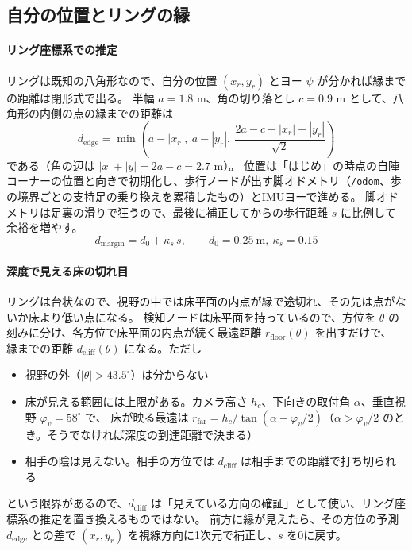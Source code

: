 \documentclass[a4paper,11pt]{ltjsarticle}
\newcommand{\code}[1]{\texttt{#1}}
\begin{document}
\subsection{自分の位置とリングの縁}\label{sec:edge}

\paragraph{リング座標系での推定}
リングは既知の八角形なので、自分の位置 $(x_r,y_r)$ とヨー $\psi$ が分かれば縁までの距離は閉形式で出る。
半幅 $a=1.8$ m、角の切り落とし $c=0.9$ m として、八角形の内側の点の縁までの距離は
\begin{equation}
d_\mathrm{edge}=\min\!\left(a-|x_r|,\ a-|y_r|,\ \frac{2a-c-|x_r|-|y_r|}{\sqrt2}\right)
\label{eq:dedge}
\end{equation}
である（角の辺は $|x|+|y|=2a-c=2.7$ m）。
位置は「はじめ」の時点の自陣コーナーの位置と向きで初期化し、歩行ノードが出す脚オドメトリ（\code{/odom}、歩の境界ごとの支持足の乗り換えを累積したもの）とIMUヨーで進める。
脚オドメトリは足裏の滑りで狂うので、最後に補正してからの歩行距離 $s$ に比例して余裕を増やす。
\begin{equation}
d_\mathrm{margin}=d_0+\kappa_s\,s,\qquad d_0=0.25\ \mathrm{m},\ \kappa_s=0.15
\label{eq:margin}
\end{equation}

\paragraph{深度で見える床の切れ目}
リングは台状なので、視野の中では床平面の内点が縁で途切れ、その先は点がないか床より低い点になる。
検知ノードは床平面を持っているので、方位を $\theta$ の刻みに分け、各方位で床平面の内点が続く最遠距離 $r_\mathrm{floor}(\theta)$ を出すだけで、
縁までの距離 $d_\mathrm{cliff}(\theta)$ になる。ただし
\begin{itemize}
\item 視野の外（$|\theta|>43.5^\circ$）は分からない
\item 床が見える範囲には上限がある。カメラ高さ $h_c$、下向きの取付角 $\alpha$、垂直視野 $\varphi_v=58^\circ$ で、
床が映る最遠は $r_\mathrm{far}=h_c/\tan(\alpha-\varphi_v/2)$（$\alpha>\varphi_v/2$ のとき。そうでなければ深度の到達距離で決まる）
\item 相手の陰は見えない。相手の方位では $d_\mathrm{cliff}$ は相手までの距離で打ち切られる
\end{itemize}
という限界があるので、$d_\mathrm{cliff}$ は「見えている方向の確証」として使い、リング座標系の推定を置き換えるものではない。
前方に縁が見えたら、その方位の予測 $d_\mathrm{edge}$ との差で $(x_r,y_r)$ を視線方向に1次元で補正し、$s$ を0に戻す。
\end{document}

